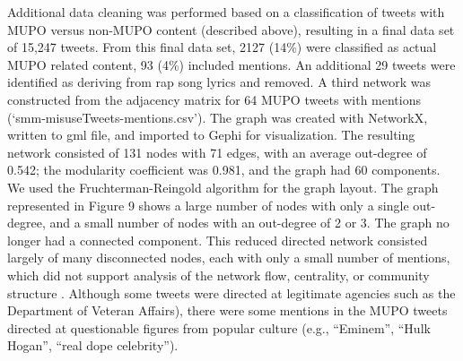 \documentclass[sigconf]{acmart}
\begin{document}
Additional data cleaning was performed based on a classification of tweets
with MUPO versus non-MUPO content (described above), resulting in a final data 
set of 15,247 tweets. From this final data set, 2127 (14\%) were classified as 
actual MUPO related content, 93 (4\%) included mentions. An additional 29 
tweets were identified as deriving from rap song lyrics and removed. A third 
network was constructed from the adjacency matrix for 64 MUPO tweets with 
mentions (`smm-misuseTweets-mentions.csv'). The graph was created with NetworkX,
written to gml file, and imported to Gephi for visualization. The resulting 
network consisted of 131 nodes with 71 edges, with an average out-degree of 0.542; 
the modularity coefficient was 0.981, and the graph had 60 components. We used
the Fruchterman-Reingold algorithm for the graph layout. The graph represented 
in Figure 9 shows a large number of nodes with only a single out-degree, and a 
small number of nodes with an out-degree of 2 or 3. The graph no longer had a 
connected component. This reduced directed network consisted largely of many 
disconnected nodes, each with only a small number of mentions, which did not
support analysis of the network flow, centrality, or community structure 
\cite{golbeck13, zafarani14}. Although some tweets were directed at legitimate 
agencies such as the Department of Veteran Affairs), there were some mentions 
in the MUPO tweets directed at questionable figures from popular culture 
(e.g., ``Eminem'', ``Hulk Hogan'', ``real dope celebrity''). 
\end{document}
